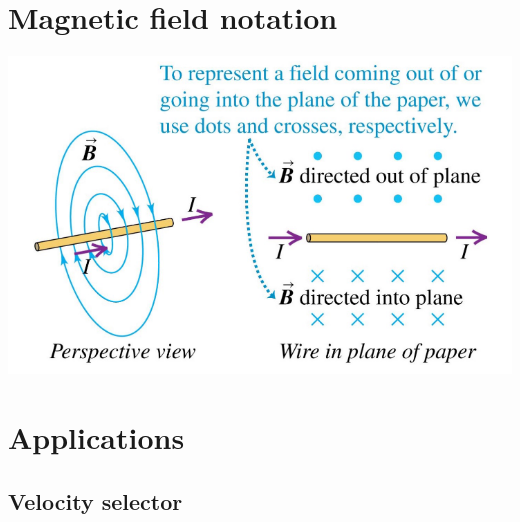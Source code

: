 \documentclass[11pt]{article}
\begin{document}
\section{Magnetic field notation}
\label{sec:org4d0be23}
\begin{center}
\includegraphics[width=.9\linewidth]{./images/magnetic-field-notation.png}
\end{center}


\section{Applications}
\label{sec:orga6a4cd1}

\subsection{Velocity selector}
\label{sec:orgd7bef26}
\end{document}
